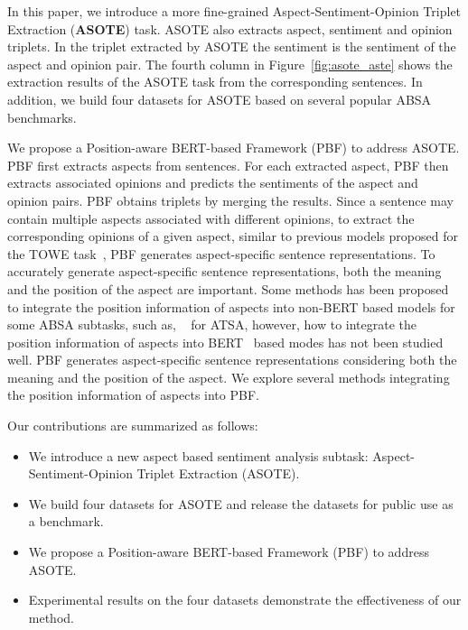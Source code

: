 \documentclass[11pt]{article}
\begin{document}
In this paper,  we introduce a more fine-grained Aspect-Sentiment-Opinion Triplet Extraction (\textbf{ASOTE}) task. ASOTE also extracts aspect, sentiment and opinion triplets. In the triplet extracted by ASOTE the sentiment is the sentiment of the aspect and opinion pair.  The fourth column in Figure~\ref{fig:asote_aste}  shows the extraction results of the ASOTE task from the corresponding sentences. In addition, we build four datasets for ASOTE based on several popular ABSA benchmarks. 

We propose a Position-aware BERT-based Framework (PBF) to address ASOTE. PBF first extracts aspects from sentences. For each extracted aspect, PBF then extracts associated opinions and predicts the sentiments of the aspect and opinion pairs. PBF obtains triplets by merging the results. Since a sentence may contain multiple aspects associated with different opinions, to extract the corresponding opinions of a given aspect, similar to previous models proposed for the TOWE task~\citep{fan2019target, wu2020latent,pouran-ben-veyseh-etal-2020-introducing,jiang-etal-2021-attention}, PBF generates aspect-specific sentence representations. To accurately generate aspect-specific sentence representations, both the meaning and the position of the aspect are important. Some methods has been proposed to integrate the position information of aspects into non-BERT based models for some ABSA subtasks, such as, ~\citet{gu-etal-2018-position,li-etal-2018-hierarchical} for ATSA, however, how to integrate the position information of aspects into BERT~\citep{devlin2019bert} based modes has not been studied well. PBF generates aspect-specific sentence representations considering both the meaning and the position of the aspect. We explore several methods integrating the position information of aspects into PBF.

Our contributions are summarized as follows:
\begin{itemize}
	\item We introduce a new aspect based sentiment analysis subtask: Aspect-Sentiment-Opinion Triplet Extraction (ASOTE).
	\item We build four datasets for ASOTE and release the datasets for public use as a benchmark.
	\item We propose a Position-aware BERT-based Framework (PBF) to address ASOTE.
	\item Experimental results on the four datasets demonstrate the effectiveness of our method.
\end{itemize}
\end{document}
